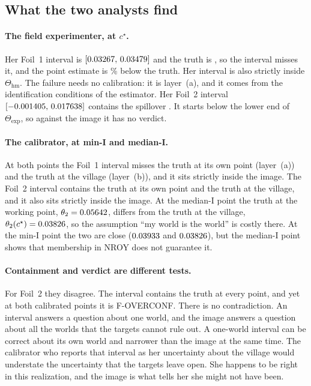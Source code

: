 \documentclass[11pt]{article}
\newcommand{\hm}{\mathrm{hm}}
\newcommand{\expset}{\mathrm{exp}}
\begin{document}
\subsection{What the two analysts find}
\paragraph{The field experimenter, at $c^\star$.}
Her Foil~1 interval is $[0.03267,\,0.03479]$ and the truth is \ThetaTwoStar,
so the interval misses it, and the point estimate is \StarPtFoilOneBelowPct\% below the truth. Her interval
is also strictly inside $\Theta_{\hm}$. The failure
needs no calibration: it is layer~(a), and it comes from the
identification conditions of the estimator. Her Foil~2 interval
$[-0.001405,\,0.017638]$ contains the spillover
\SpillStar. It starts below the lower end of $\Theta_{\expset}$, so
against the image it has no verdict.

\paragraph{The calibrator, at min-I and median-I.}
At both points the Foil~1 interval misses the truth at its own point
(layer~(a)) and the truth at the village (layer~(b)), and it sits strictly
inside the image. The Foil~2 interval contains the truth at its own
point and the truth at the village, and it also sits strictly inside the
image. At the median-I point the truth at the working point, $\theta_2=0.05642$,
differs from the truth at the village, $\theta_2(c^\star)=0.03826$, so
the assumption ``my world is the world'' is costly there. At the min-I point
the two are close ($0.03933$ and $0.03826$), but the median-I point
shows that membership in NROY does not guarantee it.

\paragraph{Containment and verdict are different tests.}
For Foil~2 they disagree. The interval contains the truth at every
point, and yet at both calibrated points it is F-OVERCONF. There is no
contradiction. An interval answers a question about one world, and the image
answers a question about all the worlds that the targets cannot rule out. A one-world
interval can be correct about its own world and narrower than the image at the same time. The
calibrator who reports that interval as her uncertainty about the village
would understate the uncertainty that the targets leave open. She happens to be right in this
realization, and the image is what tells her she might not have been.
\end{document}
